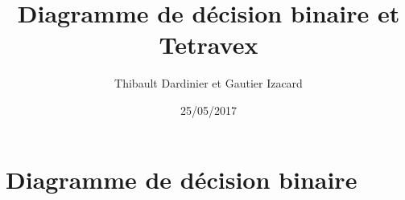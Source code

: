 \documentclass[11pt]{article}
\begin{document}
\title{Diagramme de décision binaire et Tetravex}
\author{Thibault Dardinier et Gautier Izacard}
\date{25/05/2017}
\maketitle
\tableofcontents

\section{Diagramme de décision binaire}
\end{document}
